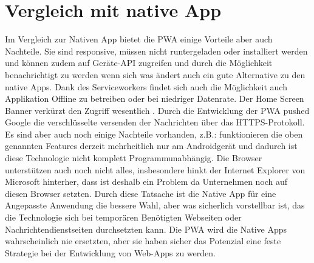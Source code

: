 \section{Vergleich mit native App}
Im Vergleich zur Nativen App bietet die \acs{PWA} einige Vorteile aber auch Nachteile. Sie sind responsive, müssen nicht runtergeladen oder installiert werden und können zudem auf Geräte-API zugreifen und durch die Möglichkeit benachrichtigt zu werden wenn sich was ändert auch ein gute Alternative zu den native Apps.
Dank des Serviceworkers findet sich auch die Möglichkeit auch Applikation Offline zu betreiben oder bei niedriger Datenrate. Der Home Screen Banner verkürzt den Zugriff wesentlich .  
Durch die Entwicklung der \acs{PWA} pushed Google die verschlüsselte versenden der Nachrichten über das HTTPS-Protokoll.
Es sind aber auch noch einige Nachteile vorhanden, z.B.: funktionieren die oben genannten Features derzeit mehrheitlich nur am Androidgerät und dadurch ist diese Technologie nicht komplett Programmunabhängig.
Die Browser unterstützen auch noch nicht alles, insbesondere hinkt der Internet Explorer von Microsoft hinterher, dass ist deshalb ein Problem da Unternehmen noch auf diesen Browser setzten. 
Durch diese Tatsache ist die Native App für eine Angepasste Anwendung die bessere Wahl, aber was sicherlich vorstellbar ist, das die Technologie sich bei temporären Benötigten Webseiten oder Nachrichtendienstseiten durchsetzten kann.
Die \acs{PWA} wird die Native Apps wahrscheinlich nie ersetzten, aber sie haben sicher das Potenzial eine feste Strategie bei der Entwicklung von \acs{Web-App}s zu werden.



